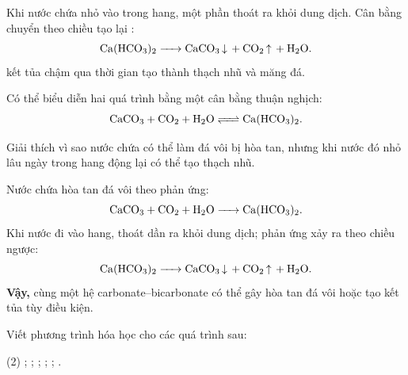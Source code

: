 Khi nước chứa  nhỏ vào trong hang, một phần  thoát ra khỏi dung dịch. Cân bằng chuyển theo chiều tạo lại :
\[
\ce{Ca(HCO3)2 -> CaCO3 v + CO2 ^ + H2O}.
\]
 kết tủa chậm qua thời gian tạo thành thạch nhũ và măng đá.

Có thể biểu diễn hai quá trình bằng một cân bằng thuận nghịch:
\[
\ce{CaCO3 + CO2 + H2O <=> Ca(HCO3)2}.
\]

\begin{vidu}
Giải thích vì sao nước chứa  có thể làm đá vôi bị hòa tan, nhưng khi nước đó nhỏ lâu ngày trong hang động lại có thể tạo thạch nhũ.
\end{vidu}
\begin{loigiai}
Nước chứa  hòa tan đá vôi theo phản ứng:
\[
\ce{CaCO3 + CO2 + H2O -> Ca(HCO3)2}.
\]
Khi nước đi vào hang,  thoát dần ra khỏi dung dịch; phản ứng xảy ra theo chiều ngược:
\[
\ce{Ca(HCO3)2 -> CaCO3 v + CO2 ^ + H2O}.
\]
\textbf{Vậy,} cùng một hệ carbonate--bicarbonate có thể gây hòa tan đá vôi hoặc tạo kết tủa  tùy điều kiện.
\end{loigiai}

\begin{tuluyen}
Viết phương trình hóa học cho các quá trình sau:
\begin{tasks}(2)
\task {};
\task {};
\task {};
\task {};
\task {};
\task {}.
\end{tasks}
\end{tuluyen}
